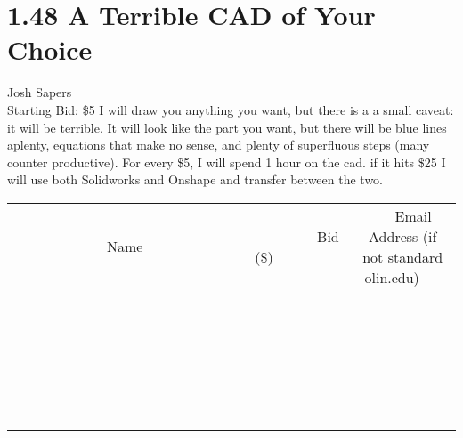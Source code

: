 \documentclass[11pt]{article}
\begin{document}
\section*{1.48 A Terrible CAD of Your Choice}
Josh Sapers
\\
Starting Bid: \$5
\newline
I will draw you anything you want, but there is a a small caveat: it will be terrible. It will look like the part you want, but there will be blue lines aplenty, equations that make no sense, and plenty of superfluous steps (many counter productive). For every \$5, I will spend 1 hour on the cad. if it hits \$25 I will use both Solidworks and Onshape and transfer between the two.
\\[6ex]
\begin{tabular}{c c c}
~~~~~~~~~~~~~Name~~~~~~~~~~~~~ & ~~~~~~~~~Bid (\$)~~~~~~~~~  & ~~~Email Address (if not standard olin.edu)~~~\\
 & & \\
\hline
 & & \\
\hline
 & & \\
\hline
 & & \\
\hline
 & & \\
\hline
 & & \\
\hline
 & & \\
\hline
 & & \\
\hline
 & & \\
\hline
 & & \\
\hline
 & & \\
\hline
 & & \\
\hline
 & & \\
\hline
 & & \\
\hline
 & & \\
\hline
 & & \\
\hline
 & & \\
\hline
 & & \\
\hline
 & & \\
\hline
 & & \\
\hline
 & & \\
\hline
 & & \\
\hline
 & & \\
\hline
 & & \\
\hline
 & & \\
\hline
 & & \\
\hline
\end{tabular}
\newpage
\end{document}
